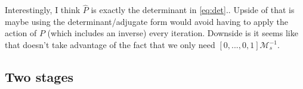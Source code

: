 \documentclass[a4paper,10pt]{article}
\begin{document}
{\color{blue}
Interestingly, I think $\widehat{P}$ is exactly the determinant in \eqref{eq:det}.. Upside
of that is maybe using the determinant/adjugate form would avoid having to apply the action
of $P$ (which includes an inverse) every iteration. Downside is it seems like that doesn't
take advantage of the fact that we only need $[0,...,0,1]\mathcal{M}_s^{-1}$.
}







\subsection{Two stages}
\end{document}
